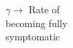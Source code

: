 \documentclass[preview]{standalone}
\begin{document}
\begin{center}
$\gamma \rightarrow$ Rate of\\becoming fully\\symptomatic
\end{center}
\end{document}
